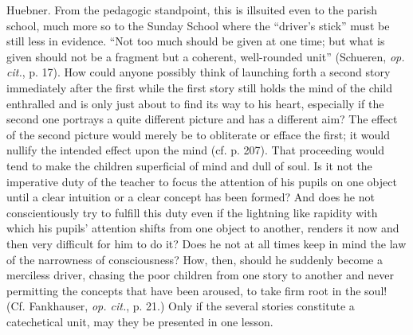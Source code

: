 Huebner. From the pedagogic standpoint, this is illsuited even to the parish school, much more so to the Sunday School where the “driver’s stick” must be still less in evidence. “Not too much should be given at one time; but what is given should not be a fragment but a coherent, well-rounded unit” (Schueren, \emph{op. cit.}, p. 17). How could anyone possibly think of launching forth a second story immediately after the first while the first story still holds the mind of the child enthralled and is only just about to find its way to his heart, especially if the second one portrays a quite different picture and has a different aim? The effect of the second picture would merely be to obliterate or efface the first; it would nullify the intended effect upon the mind (cf. p. 207). That proceeding would tend to make the children superficial of mind and dull of soul. Is it not the imperative duty of the teacher to focus the attention of his pupils on one object until a clear intuition or a clear concept has been formed? And does he not conscientiously try to fulfill this duty even if the lightning like rapidity with which his pupils’ attention shifts from one object to another, renders it now and then very difficult for him to do it? Does he not at all times keep in mind the law of the narrowness of consciousness? How, then, should he suddenly become a merciless driver, chasing the poor children from one story to another and never permitting the concepts that have been aroused, to take firm root in the soul! (Cf. Fankhauser, \emph{op. cit.}, p. 21.) Only if the several stories constitute a catechetical unit, may they be presented in one lesson.

